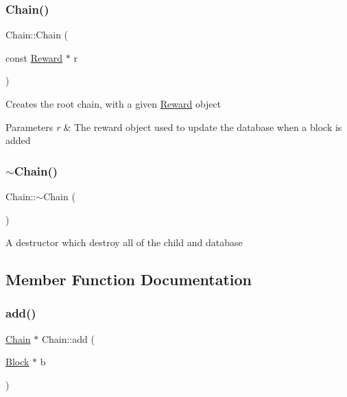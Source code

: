 \subsubsection{\texorpdfstring{Chain()}{Chain()}\hspace{0.1cm}{\footnotesize\ttfamily [2/2]}}
{\footnotesize\ttfamily Chain\+::\+Chain (\begin{DoxyParamCaption}\item[{const \mbox{\hyperlink{classReward}{Reward}} $\ast$}]{r }\end{DoxyParamCaption})}

Creates the root chain, with a given \mbox{\hyperlink{classReward}{Reward}} object


\begin{DoxyParams}{Parameters}
{\em r} & The reward object used to update the database when a block is added \\
\hline
\end{DoxyParams}
\mbox{\label{classChain_a06b56afcf5b9ef0c6371b49ae2eef2da}} 
\subsubsection{\texorpdfstring{$\sim$\+Chain()}{~Chain()}}
{\footnotesize\ttfamily Chain\+::$\sim$\+Chain (\begin{DoxyParamCaption}{ }\end{DoxyParamCaption})}

A destructor which destroy all of the child and database 

\subsection{Member Function Documentation}
\mbox{\label{classChain_a7a271a75a12aeae52a2645dcaa14549c}} 
\subsubsection{\texorpdfstring{add()}{add()}}
{\footnotesize\ttfamily \mbox{\hyperlink{classChain}{Chain}} $\ast$ Chain\+::add (\begin{DoxyParamCaption}\item[{\mbox{\hyperlink{classBlock}{Block}} $\ast$}]{b }\end{DoxyParamCaption})}

